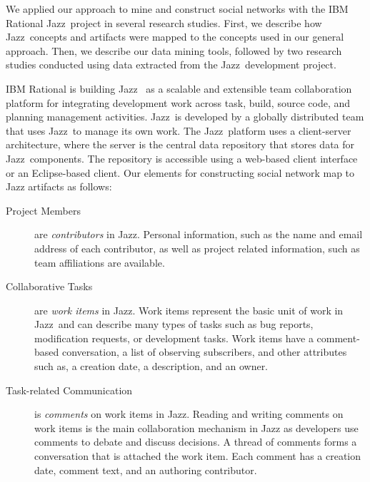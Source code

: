 \documentclass[12pt,oneside]{book}
\newcommand{\jazztm}{Jazz}
\begin{document}
We applied our approach to mine and construct social networks with the IBM
Rational \jazztm\ project in several research studies. First, we describe how
\jazztm\ concepts and artifacts were mapped to the concepts used in our general
approach. Then, we describe our data mining tools, followed by two research
studies conducted using data extracted from the \jazztm\ development project.

IBM Rational is building \jazztm\ \cite{frost:ieeesoftware:2007} as a scalable and
extensible team collaboration platform for integrating development work across
task, build, source code, and planning management activities. \jazztm\ is
developed by a globally distributed team that uses \jazztm\ to manage its own
work. The \jazztm\ platform uses a client-server architecture, where the server
is the central data repository that stores data for \jazztm\ components. The
repository is accessible using a web-based client interface or an Eclipse-based
client. Our elements for constructing social network map to Jazz artifacts as
follows:

\begin{description}
\item[Project Members] are \emph{contributors} in Jazz.
Personal information, such as the name and email address of each contributor, as well as
project related information, such as team affiliations are available.

\item[Collaborative Tasks] are \emph{work items} in Jazz. Work items represent
the basic unit of work in \jazztm\ and can describe many types of tasks such as
bug reports, modification requests, or development tasks. Work items have a
comment-based conversation, a list of observing subscribers, and other attributes
such as, a creation date, a description, and an owner.

\item[Task-related Communication] is \emph{comments} on work items in Jazz.
Reading and writing comments on work items is the main collaboration mechanism in
Jazz as developers use comments to debate and discuss decisions. A thread of
comments forms a conversation that is attached the work item. Each comment
has a creation date, comment text, and an authoring contributor.

\end{description}
\end{document}
